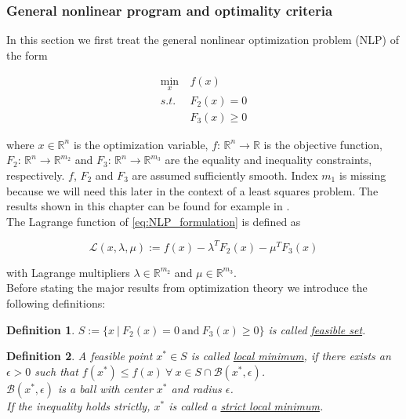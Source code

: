 \documentclass{scrartcl}[12pt, halfparskip]
\numberwithin{equation}{section}
\numberwithin{figure}{section}
\numberwithin{table}{section}
\newtheorem{Definition}{Definition}
\begin{document}
\subsubsection{General nonlinear program and optimality criteria}
\label{sec:optimization_theory_NLP}
In this section we first treat the general nonlinear optimization problem (NLP) of the form

\begin{align}
	\min_x & \ f(x) \label{eq:NLP_formulation} \\
	s.t. & \ F_2(x) = 0 \nonumber \\
	& \ F_3(x) \ge 0 \nonumber
\end{align}

where $x \in \mathbb{R}^n$ is the optimization variable, $f\text{: } \mathbb{R}^n \rightarrow \mathbb{R}$ is the objective function, $F_2\text{: } \mathbb{R}^n \rightarrow \mathbb{R}^{m_2}$ and $F_3\text{: } \mathbb{R}^n \rightarrow \mathbb{R}^{m_3}$ are the equality and inequality constraints, respectively. $f$, $F_2$ and $F_3$ are assumed sufficiently smooth. Index $m_1$ is missing because we will need this later in the context of a least squares problem. The results shown in this chapter can be found for example in \cite{nonlinear_optimiziation_wright}. \\

The Lagrange function of \cref{eq:NLP_formulation} is defined as

\begin{equation}
	\mathcal{L}(x,\lambda,\mu) := f(x) - \lambda^T F_2(x) - \mu^T F_3(x)
\end{equation}

with Lagrange multipliers $\lambda \in \mathbb{R}^{m_2}$ and $\mu \in \mathbb{R}^{m_3}$. \\

Before stating the major results from optimization theory we introduce the following definitions:

\begin{Definition}
	$S := \{ x \ | \ F_2(x) = 0 \ \text{and} \ F_3(x) \ge 0 \}$ is called \underline{feasible set}.
\end{Definition}

\begin{Definition}
	A feasible point $x^* \in S$ is called \underline{local minimum}, if there exists an $\epsilon > 0$ such that $f(x^*) \le f(x) \ \forall \ x \in S \cap \mathcal{B}(x^*, \epsilon)$. \\
	$\mathcal{B}(x^*, \epsilon)$ is a ball with center $x^*$ and radius $\epsilon$. \\
	If the inequality holds strictly, $x^*$ is called a \underline{strict local minimum}.
\end{Definition}
\end{document}
